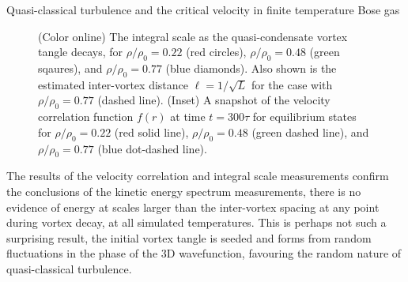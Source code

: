 \begin{chapter}{\label{cha:nonequib}Quasi-classical turbulence and the critical velocity in finite temperature Bose gas}
\begin{figure}
\centering
{}
  \caption{\label{fig:IS_t}(Color online) The integral scale as the quasi-condensate vortex tangle decays, for $\rho/\rho_0=0.22$ (red circles), $\rho/\rho_0=0.48$ (green sqaures), and $\rho/\rho_0=0.77$ (blue diamonds). Also shown is the estimated inter-vortex distance $\ell = 1/\sqrt{L}$ for the case with $\rho/\rho_0=0.77$ (dashed line). (Inset) A snapshot of the velocity correlation function $f(r)$ at time $t = 300\tau$ for equilibrium states for $\rho/\rho_0=0.22$ (red solid line), $\rho/\rho_0=0.48$ (green dashed line), and $\rho/\rho_0=0.77$ (blue dot-dashed line).}
\end{figure}

The results of the velocity correlation and integral scale measurements confirm the conclusions of the kinetic energy spectrum measurements, there is no evidence of energy at scales larger than the inter-vortex spacing at any point during vortex decay, at all simulated temperatures. This is perhaps not such a surprising result, the initial vortex tangle is seeded and forms from random fluctuations in the phase of the 3D wavefunction, favouring the random nature of quasi-classical turbulence.



\end{chapter}
